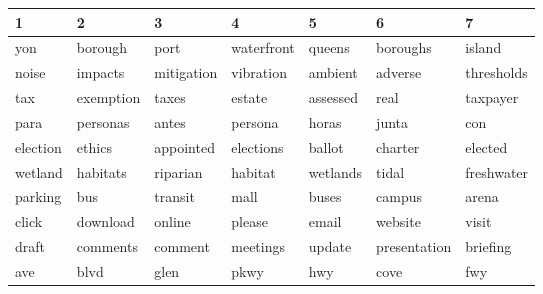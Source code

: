 \begin{table}[ht]
\centering
\begingroup\footnotesize
\begin{tabular}{lllllll}
  \hline
1 & 2 & 3 & 4 & 5 & 6 & 7 \\ 
  \hline
\cellcolor{red!10}yon & \cellcolor{red!10}borough & \cellcolor{red!10}port & \cellcolor{red!10}waterfront & \cellcolor{red!10}queens & \cellcolor{red!10}boroughs & \cellcolor{red!10}island \\ 
  \cellcolor{blue!10}noise & \cellcolor{blue!10}impacts & \cellcolor{blue!10}mitigation & \cellcolor{blue!10}vibration & \cellcolor{blue!10}ambient & \cellcolor{blue!10}adverse & \cellcolor{blue!10}thresholds \\ 
  \cellcolor{red!10}tax & \cellcolor{red!10}exemption & \cellcolor{red!10}taxes & \cellcolor{red!10}estate & \cellcolor{red!10}assessed & \cellcolor{red!10}real & \cellcolor{red!10}taxpayer \\ 
  \cellcolor{red!10}para & \cellcolor{red!10}personas & \cellcolor{red!10}antes & \cellcolor{red!10}persona & \cellcolor{red!10}horas & \cellcolor{red!10}junta & \cellcolor{red!10}con \\ 
  \cellcolor{blue!10}election & \cellcolor{blue!10}ethics & \cellcolor{blue!10}appointed & \cellcolor{blue!10}elections & \cellcolor{blue!10}ballot & \cellcolor{blue!10}charter & \cellcolor{blue!10}elected \\ 
  \cellcolor{red!10}wetland & \cellcolor{red!10}habitats & \cellcolor{red!10}riparian & \cellcolor{red!10}habitat & \cellcolor{red!10}wetlands & \cellcolor{red!10}tidal & \cellcolor{red!10}freshwater \\ 
  \cellcolor{blue!10}parking & \cellcolor{blue!10}bus & \cellcolor{blue!10}transit & \cellcolor{blue!10}mall & \cellcolor{blue!10}buses & \cellcolor{blue!10}campus & \cellcolor{blue!10}arena \\ 
  \cellcolor{red!30}click & \cellcolor{red!30}download & \cellcolor{red!30}online & \cellcolor{red!30}please & \cellcolor{red!30}email & \cellcolor{red!30}website & \cellcolor{red!30}visit \\ 
  \cellcolor{blue!10}draft & \cellcolor{blue!10}comments & \cellcolor{blue!10}comment & \cellcolor{blue!10}meetings & \cellcolor{blue!10}update & \cellcolor{blue!10}presentation & \cellcolor{blue!10}briefing \\ 
  \cellcolor{blue!10}ave & \cellcolor{blue!10}blvd & \cellcolor{blue!10}glen & \cellcolor{blue!10}pkwy & \cellcolor{blue!10}hwy & \cellcolor{blue!10}cove & \cellcolor{blue!10}fwy \\ 

\end{tabular}
\end{table}

